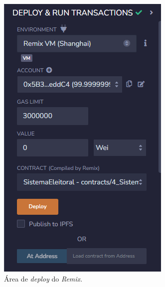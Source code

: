 \documentclass[portuguese]{textolivre}
\begin{document}
	
	\begin{figure}[htbp]
		\centering
		\begin{minipage}{0.5\textwidth}
			\includegraphics[width=\textwidth]{fig-004.png} %
			\caption{Área de \textit{deploy} do \textit{Remix}.}
			\label{deploy}
		\end{minipage}
	\end{figure}
	
	
	
\end{document}
